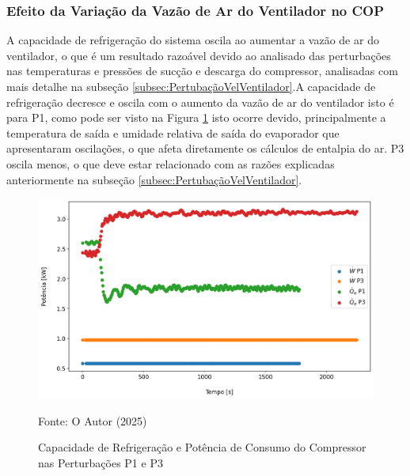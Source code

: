 \subsubsection{Efeito da Variação da Vazão de Ar do Ventilador no COP}

A capacidade de refrigeração do sistema oscila ao aumentar a vazão de ar do ventilador, o que é um resultado razoável devido ao analisado das perturbações nas temperaturas e pressões de sucção e descarga do compressor, analisadas com mais detalhe na subseção \ref{subsec:PertubaçãoVelVentilador}.A capacidade de refrigeração decresce e oscila com o aumento da vazão de ar do ventilador isto é para P1, como pode ser visto na Figura \ref{fig:Qe e W Perturbação Ventilador} isto ocorre devido, principalmente a temperatura de saída e umidade relativa de saída do evaporador que apresentaram oscilações, o que afeta diretamente os cálculos de entalpia do ar. P3 oscila menos, o que deve estar relacionado com as razões explicadas anteriormente na subseção \ref{subsec:PertubaçãoVelVentilador}.

\begin{figure}[h]
    \centering
    \includegraphics[width=1\linewidth]{FigurasdoTexto/Qe e W Perturbação Ventilador.png}
    \caption{Capacidade de Refrigeração e Potência de Consumo do Compressor nas Perturbações P1 e P3}
    \label{fig:Qe e W Perturbação Ventilador}
    {\footnotesize Fonte: O Autor (2025)}
\end{figure}


